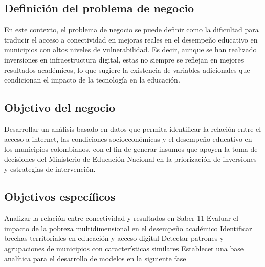 \subsection{Definición del problema de negocio}
En este contexto, el problema de negocio se puede definir como la dificultad para traducir el acceso a conectividad en mejoras reales en el desempeño educativo en municipios con altos niveles de vulnerabilidad.
Es decir, aunque se han realizado inversiones en infraestructura digital, estas no siempre se reflejan en mejores resultados académicos, lo que sugiere la existencia de variables adicionales que condicionan el impacto de la tecnología en la educación.
\subsection{Objetivo del negocio}
Desarrollar un análisis basado en datos que permita identificar la relación entre el acceso a internet, las condiciones socioeconómicas y el desempeño educativo en los municipios colombianos, con el fin de generar insumos que apoyen la toma de decisiones del Ministerio de Educación Nacional en la priorización de inversiones y estrategias de intervención.
\subsection{Objetivos específicos}
Analizar la relación entre conectividad y resultados en Saber 11
Evaluar el impacto de la pobreza multidimensional en el desempeño académico
Identificar brechas territoriales en educación y acceso digital
Detectar patrones y agrupaciones de municipios con características similares
Establecer una base analítica para el desarrollo de modelos en la siguiente fase